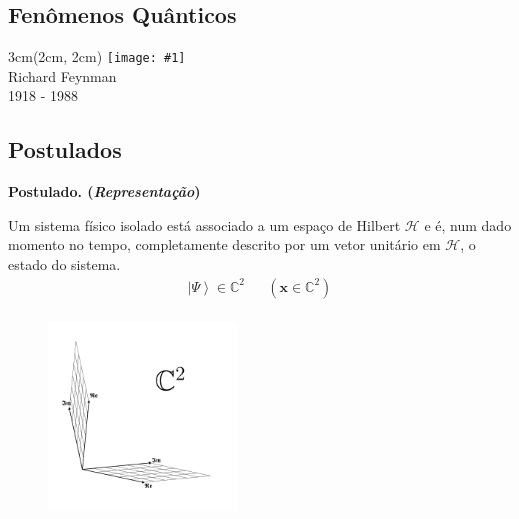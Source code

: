 \documentclass[t]{beamer}
\newcommand{\postulado}[1]{%
	\textbf{Postulado. (\emph{#1})\\}
}
\newcommand{\ket}[1]{\ensuremath{\left|#1\right\rangle}}
\newcommand{\braket}[2]{\ensuremath{\left\langle#1|#2\right\rangle}}
\newcommand{\person}[6]{%
\begin{textblock*}{#4}(#5, #6)
	\texttt{[image: \#1]}\\
	#2\\
	{\small #3}
\end{textblock*}
}
\begin{document}
	\subsection{Fenômenos Quânticos}
	
	\begin{frame}{\subsecname}
		\person{feynman.jpg}{Richard Feynman}{1918 - 1988}{3cm}{2cm}{2cm}
			
	\end{frame}
	
	\subsection{Postulados}
	
	\begin{frame}{\subsecname}
		\postulado{Representação}
		Um sistema físico isolado está associado a um espaço de Hilbert $\mathcal{H}$ e é, num dado momento no tempo, completamente descrito por um vetor unitário em $\mathcal{H}$, o estado do sistema.		
		\begin{align*}
			\ket{\Psi} \in \mathbb{C}^2 && (\mathbf{x} \in \mathbb{C}^2)\\
		\end{align*}
		\vspace{-1cm} 
		\begin{figure}[H]
			\includegraphics[width=5cm]{c2.pdf}
		\end{figure}
	\end{frame}
	
\end{document}
